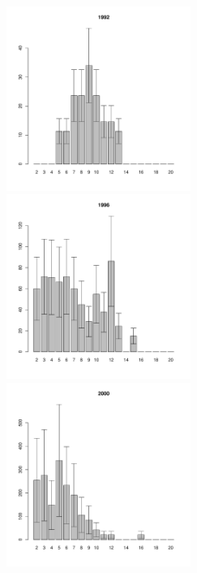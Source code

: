 	\begin{figure}[hp]

	\begin{minipage}[b]{.3\linewidth}
	\begin{center}
	\includegraphics[width=60mm]{../White_Sea/Luvenga_II_razrez/high_beatch2_1992_.pdf}	
	\end{center}
	\end{minipage}
	\hfil %
	\begin{minipage}[b]{.3\linewidth}
	\begin{center}
	\includegraphics[width=60mm]{../White_Sea/Luvenga_II_razrez/high_beatch2_1996_.pdf}
	\end{center}
	\end{minipage}
	\hfil %
	\begin{minipage}[b]{.3\linewidth}
	\begin{center}
\includegraphics[width=60mm]{../White_Sea/Luvenga_II_razrez/high_beatch2_2000_.pdf}

\end{center}
\end{minipage}
\end{figure}
